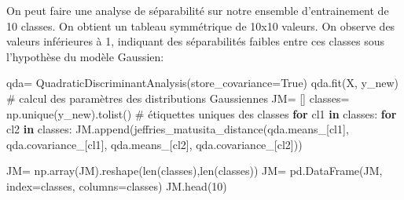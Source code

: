 \documentclass[
  11pt,
  letterpaper,
  open=any,
  twoside=false,
  french]{scrbook}
\newenvironment{Shaded}{\begin{snugshade}}{\end{snugshade}}
\newcommand{\BuiltInTok}[1]{\textcolor[rgb]{0.00,0.23,0.31}{#1}}
\newcommand{\CommentTok}[1]{\textcolor[rgb]{0.37,0.37,0.37}{#1}}
\newcommand{\ControlFlowTok}[1]{\textcolor[rgb]{0.00,0.23,0.31}{\textbf{#1}}}
\newcommand{\DecValTok}[1]{\textcolor[rgb]{0.68,0.00,0.00}{#1}}
\newcommand{\KeywordTok}[1]{\textcolor[rgb]{0.00,0.23,0.31}{\textbf{#1}}}
\newcommand{\NormalTok}[1]{\textcolor[rgb]{0.00,0.23,0.31}{#1}}
\newcommand{\OperatorTok}[1]{\textcolor[rgb]{0.37,0.37,0.37}{#1}}
\newcommand{\VariableTok}[1]{\textcolor[rgb]{0.07,0.07,0.07}{#1}}
\begin{document}
On peut faire une analyse de séparabilité sur notre ensemble
d'entrainement de 10 classes. On obtient un tableau symmétrique de 10x10
valeurs. On observe des valeurs inférieures à 1, indiquant des
séparabilités faibles entre ces classes sous l'hypothèse du modèle
Gaussien:

\begin{Shaded}
\begin{Highlighting}[]
\NormalTok{qda}\OperatorTok{=}\NormalTok{ QuadraticDiscriminantAnalysis(store\_covariance}\OperatorTok{=}\VariableTok{True}\NormalTok{)}
\NormalTok{qda.fit(X, y\_new) }\CommentTok{\# calcul des paramètres des distributions Gaussiennes}
\NormalTok{JM}\OperatorTok{=}\NormalTok{ []}
\NormalTok{classes}\OperatorTok{=}\NormalTok{ np.unique(y\_new).tolist() }\CommentTok{\# étiquettes uniques des classes}
\ControlFlowTok{for}\NormalTok{ cl1 }\KeywordTok{in}\NormalTok{ classes:}
  \ControlFlowTok{for}\NormalTok{ cl2 }\KeywordTok{in}\NormalTok{ classes:}
\NormalTok{    JM.append(jeffries\_matusita\_distance(qda.means\_[cl1], qda.covariance\_[cl1], qda.means\_[cl2], qda.covariance\_[cl2]))}

\NormalTok{JM}\OperatorTok{=}\NormalTok{ np.array(JM).reshape(}\BuiltInTok{len}\NormalTok{(classes),}\BuiltInTok{len}\NormalTok{(classes))}
\NormalTok{JM}\OperatorTok{=}\NormalTok{ pd.DataFrame(JM, index}\OperatorTok{=}\NormalTok{classes, columns}\OperatorTok{=}\NormalTok{classes)}
\NormalTok{JM.head(}\DecValTok{10}\NormalTok{)}
\end{Highlighting}
\end{Shaded}
\end{document}
